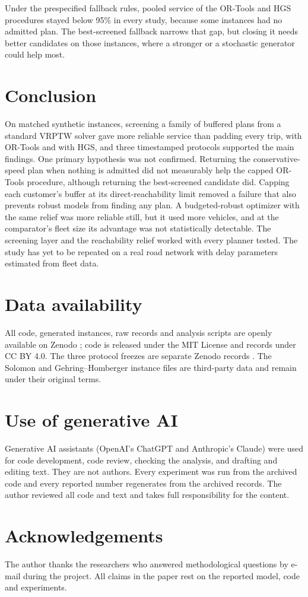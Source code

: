 \documentclass{itor}
\begin{document}
Under the prespecified fallback rules, pooled service of the OR-Tools and HGS
procedures stayed below 95\% in every study, because some instances had no
admitted plan. The best-screened fallback
narrows that gap, but closing it needs better candidates on those instances,
where a stronger or a stochastic generator could help most.

\section{Conclusion}\label{sec:conclusion}

On matched synthetic instances, screening a family of buffered plans from a
standard VRPTW solver gave more reliable service than padding every trip, with
OR-Tools and with HGS, and three timestamped protocols supported the main
findings. One primary hypothesis was not confirmed. Returning the
conservative-speed plan when nothing is admitted did not measurably help the
capped OR-Tools procedure, although returning the best-screened candidate did.
Capping each customer's buffer at its direct-reachability limit removed a
failure that also prevents robust models from finding any plan. A
budgeted-robust optimizer with the same relief was more reliable still, but it
used more vehicles, and at the comparator's fleet size its advantage was not
statistically detectable. The screening layer and the reachability relief worked with every
planner tested. The study has yet to be repeated on a real road network with
delay parameters estimated from fleet data.

\section*{Data availability}
All code, generated instances, raw records and analysis scripts are openly
available on Zenodo \citep{ali2026archive}; code is released under the MIT
License and records under CC BY 4.0. The three protocol freezes are separate
Zenodo records \citep{ali2026freeze,ali2026freeze2,ali2026freeze3}. The Solomon
and Gehring--Homberger instance files are third-party data
\citep{solomon1987,ml4vrp2024,gehring1999} and remain under their original
terms.

\section*{Use of generative AI}
Generative AI assistants (OpenAI's ChatGPT and Anthropic's Claude) were used for
code development, code review, checking the analysis, and drafting and editing
text. They are not authors. Every experiment was run from the archived code and
every reported number regenerates from the archived records. The author reviewed
all code and text and takes full responsibility for the content.

\section*{Acknowledgements}
The author thanks the researchers who answered methodological questions by
e-mail during the project. All claims in the paper rest on the reported model,
code and experiments.



\end{document}
